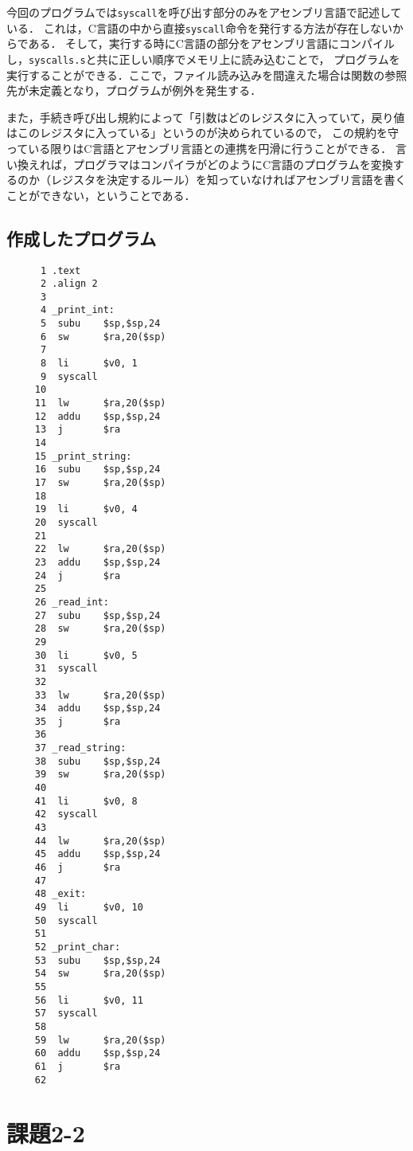 \documentclass[a4j,11pt]{jarticle}
\begin{document}
今回のプログラムでは{\tt syscall}を呼び出す部分のみをアセンブリ言語で記述している．
これは，C言語の中から直接{\tt syscall}命令を発行する方法が存在しないからである．
そして，実行する時にC言語の部分をアセンブリ言語にコンパイルし，{\tt syscalls.s}と共に正しい順序でメモリ上に読み込むことで，
プログラムを実行することができる．ここで，ファイル読み込みを間違えた場合は関数の参照先が未定義となり，プログラムが例外を発生する．

また，手続き呼び出し規約によって「引数はどのレジスタに入っていて，戻り値はこのレジスタに入っている」というのが決められているので，
この規約を守っている限りはC言語とアセンブリ言語との連携を円滑に行うことができる．
言い換えれば，プログラマはコンパイラがどのようにC言語のプログラムを変換するのか（レジスタを決定するルール）を知っていなければアセンブリ言語を書くことができない，ということである．

\subsection{作成したプログラム}\label{sec:sourcecode-1-1}
\begin{verbatim}
      1	.text
      2	.align 2
      3	
      4	_print_int:
      5	 subu    $sp,$sp,24
      6	 sw      $ra,20($sp)
      7	
      8	 li      $v0, 1
      9	 syscall
     10	
     11	 lw      $ra,20($sp)
     12	 addu    $sp,$sp,24
     13	 j       $ra 
     14	
     15	_print_string:
     16	 subu    $sp,$sp,24
     17	 sw      $ra,20($sp)
     18	
     19	 li      $v0, 4
     20	 syscall
     21	
     22	 lw      $ra,20($sp)
     23	 addu    $sp,$sp,24
     24	 j       $ra 
     25	
     26	_read_int:
     27	 subu    $sp,$sp,24
     28	 sw      $ra,20($sp)
     29	
     30	 li      $v0, 5
     31	 syscall
     32	
     33	 lw      $ra,20($sp)
     34	 addu    $sp,$sp,24
     35	 j       $ra 
     36	
     37	_read_string:
     38	 subu    $sp,$sp,24
     39	 sw      $ra,20($sp)
     40	
     41	 li      $v0, 8
     42	 syscall
     43	
     44	 lw      $ra,20($sp)
     45	 addu    $sp,$sp,24
     46	 j       $ra
     47	
     48	_exit:
     49	 li      $v0, 10
     50	 syscall
     51	
     52	_print_char:
     53	 subu    $sp,$sp,24
     54	 sw      $ra,20($sp)
     55	
     56	 li      $v0, 11
     57	 syscall
     58	
     59	 lw      $ra,20($sp)
     60	 addu    $sp,$sp,24
     61	 j       $ra 
     62	 
\end{verbatim}

\section{課題2-2}
\end{document}
